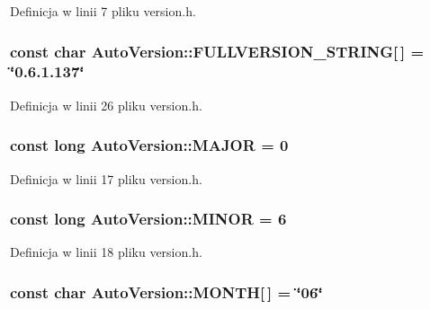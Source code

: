 Definicja w linii 7 pliku version.h.\hypertarget{a00019_2c666a4ee8f49f7647b06e6c526858ad}{
\subsubsection[{FULLVERSION\_\-STRING}]{\setlength{\rightskip}{0pt plus 5cm}const char {\bf AutoVersion::FULLVERSION\_\-STRING}\mbox{[}$\,$\mbox{]} = \char`\"{}0.6.1.137\char`\"{}}}
\label{dd/da2/a00019_2c666a4ee8f49f7647b06e6c526858ad}




Definicja w linii 26 pliku version.h.\hypertarget{a00019_85ad69390168fa80a3868ae22631b48c}{
\subsubsection[{MAJOR}]{\setlength{\rightskip}{0pt plus 5cm}const long {\bf AutoVersion::MAJOR} = 0}}
\label{dd/da2/a00019_85ad69390168fa80a3868ae22631b48c}




Definicja w linii 17 pliku version.h.\hypertarget{a00019_2c324b304c1d4c4d273f848c50679eb4}{
\subsubsection[{MINOR}]{\setlength{\rightskip}{0pt plus 5cm}const long {\bf AutoVersion::MINOR} = 6}}
\label{dd/da2/a00019_2c324b304c1d4c4d273f848c50679eb4}




Definicja w linii 18 pliku version.h.\hypertarget{a00019_c5504cfe250e5b6e09bde81a917c4349}{
\subsubsection[{MONTH}]{\setlength{\rightskip}{0pt plus 5cm}const char {\bf AutoVersion::MONTH}\mbox{[}$\,$\mbox{]} = \char`\"{}06\char`\"{}}}
\label{dd/da2/a00019_c5504cfe250e5b6e09bde81a917c4349}




